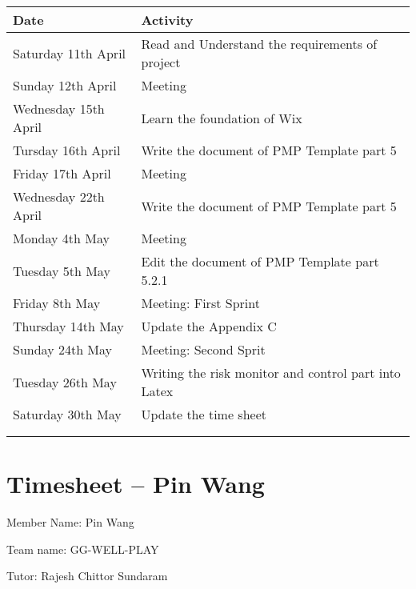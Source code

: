 \begin{tabularx}{0.95\linewidth}{%
	l%
	>{\raggedright\arraybackslash}X}%
	\toprule
	Date & Activity\\
	\midrule
	Saturday 11th April & Read and Understand the requirements of project\\
	\midrule
	Sunday 12th April & Meeting\\
	\midrule
	Wednesday 15th April & Learn the foundation of Wix\\
	\midrule
	Tursday 16th April & Write the document of PMP Template part 5\\
	\midrule
	Friday 17th April & Meeting\\
	\midrule
	Wednesday 22th April & Write the document of PMP Template part 5\\
	\midrule
	Monday 4th May & Meeting\\
	\midrule
	Tuesday 5th May & Edit the document of PMP Template part 5.2.1\\
	\midrule
	Friday 8th May & Meeting: First Sprint\\
	\midrule
	Thursday 14th May & Update the Appendix C\\
	\midrule
	Sunday 24th May & Meeting: Second Sprit\\
	\midrule
	Tuesday 26th May & Writing the risk monitor and control part into Latex\\
	\midrule
	Saturday 30th May & Update the time sheet\\
	\bottomrule
	\\
	\caption{Timesheet -- Hongkang Li}  
	\label{tab:timesheetHongkang}
\end{tabularx}

\clearpage
\section*{Timesheet – Pin Wang}
Member Name: Pin Wang

Team name: GG-WELL-PLAY

Tutor: Rajesh Chittor Sundaram

